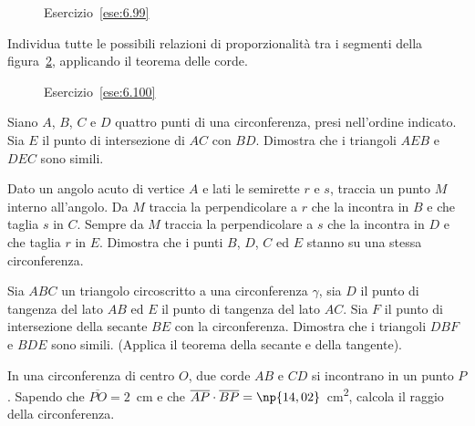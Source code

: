 \begin{figure}[!htb]
	\centering
	\caption{Esercizio~\ref{ese:6.99}}\label{fig:ese6.99}
\end{figure}

\begin{esercizio}
\label{ese:6.100}
Individua tutte le possibili relazioni di proporzionalità tra i segmenti della figura~\ref{fig:ese6.100}, applicando il teorema delle corde.
\end{esercizio}

\begin{figure}[!htb]
	\centering
	\caption{Esercizio~\ref{ese:6.100}}\label{fig:ese6.100}
\end{figure}

\begin{esercizio}
\label{ese:6.101}
Siano $A$, $B$, $C$ e $D$ quattro punti di una circonferenza, presi nell'ordine indicato. Sia $E$ il punto di intersezione di $AC$ con $BD$. Dimostra che i triangoli $AEB$ e $DEC$ sono simili.
\end{esercizio}

\begin{esercizio}
\label{ese:6.102}
Dato un angolo acuto di vertice $A$ e lati le semirette $r$ e $s$, traccia un punto $M$ interno all'angolo. Da $M$ traccia la perpendicolare a $r$ che la incontra in $B$ e che taglia $s$ in $C$. Sempre da $M$ traccia la perpendicolare a $s$ che la incontra in $D$ e che taglia $r$ in $E$. Dimostra che i punti $B$, $D$, $C$ ed $E$ stanno su una stessa circonferenza. 
\end{esercizio}

\begin{esercizio}
\label{ese:6.103}
Sia $ABC$ un triangolo circoscritto a una circonferenza $\gamma$, sia $D$ il punto di tangenza del lato $AB$ ed $E$ il punto di tangenza del lato $AC$. Sia $F$ il punto di intersezione della secante $BE$ con la circonferenza. Dimostra che i triangoli $DBF$ e $BDE$ sono simili. (Applica il teorema della secante e della tangente).
\end{esercizio}

\begin{esercizio}
\label{ese:6.104}
In una circonferenza di centro $O$, due corde $AB$ e $CD$ si incontrano in un punto $P$. Sapendo che $\overline{PO}=2$~cm e che $\overline{AP}\cdot \overline{BP}=\np{14,02}$~cm\textsuperscript{2}, calcola il raggio della circonferenza.
\end{esercizio}

